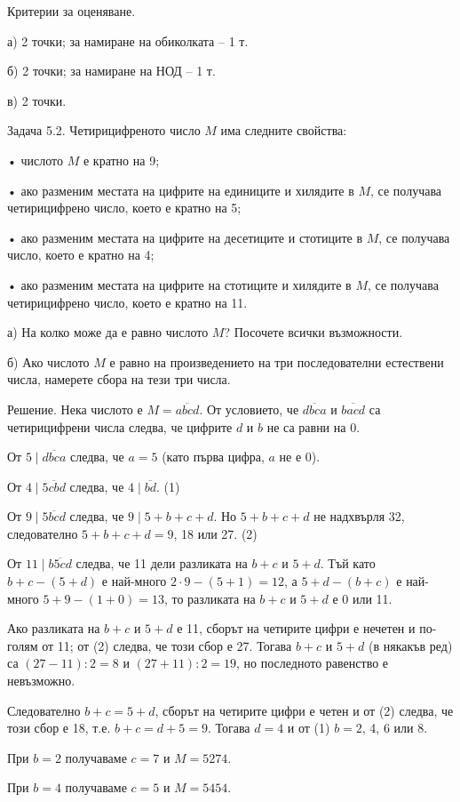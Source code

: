 Критерии за оценяване.

а) 2 точки; за намиране на обиколката – 1 т.

б) 2 точки; за намиране на НОД – 1 т.

в) 2 точки.

Задача 5.2. Четирицифреното число $M$ има следните свойства:

• числото $M$ е кратно на 9;

• ако разменим местата на цифрите на единиците и хилядите в $M$, се получава четирицифрено число, което е кратно на 5;

• ако разменим местата на цифрите на десетиците и стотиците в $M$, се получава число, което е кратно на 4;

• ако разменим местата на цифрите на стотиците и хилядите в $M$, се получава четирицифрено число, което е кратно на 11.

а) На колко може да е равно числото $M$? Посочете всички възможности.

б) Ако числото $M$ е равно на произведението на три последователни естествени числа, намерете сбора на тези три числа.

Решение. Нека числото е $M=\overline{abcd}$. От условието, че $\overline{dbca}$ и $\overline{bacd}$ са четирицифрени числа следва, че цифрите $d$ и $b$ не са равни на 0.

От $5\mid\overline{dbca}$ следва, че $a=5$ (като първа цифра, $a$ не е 0).

От $4\mid\overline{5cbd}$ следва, че $4\mid\overline{bd}$. (1)

От $9\mid\overline{5bcd}$ следва, че $9\mid 5+b+c+d$. Но $5+b+c+d$ не надхвърля 32, следователно $5+b+c+d=9$, 18 или 27. (2)

От $11\mid\overline{b5cd}$ следва, че 11 дели разликата на $b+c$ и $5+d$. Тъй като $b+c-(5+d)$ е най-много $2\cdot9-(5+1)=12$, а $5+d-(b+c)$ е най-много $5+9-(1+0)=13$, то разликата на $b+c$ и $5+d$ е 0 или 11.

Ако разликата на $b+c$ и $5+d$ е 11, сборът на четирите цифри е нечетен и по-голям от 11; от (2) следва, че този сбор е 27. Тогава $b+c$ и $5+d$ (в някакъв ред) са $(27-11):2=8$ и $(27+11):2=19$, но последното равенство е невъзможно.

Следователно $b+c=5+d$, сборът на четирите цифри е четен и от (2) следва, че този сбор е 18, т.е. $b+c=d+5=9$. Тогава $d=4$ и от (1) $b=2$, 4, 6 или 8.

При $b=2$ получаваме $c=7$ и $M=5274$.

При $b=4$ получаваме $c=5$ и $M=5454$.

